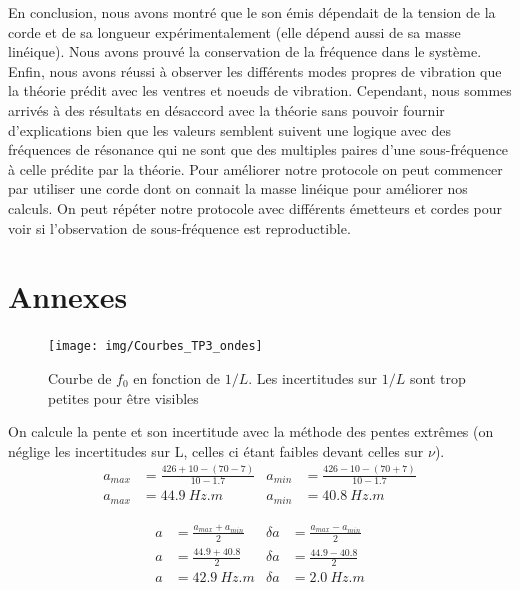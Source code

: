 \documentclass[11pt]{article}
\begin{document}
En conclusion, nous avons montré que le son émis dépendait de la tension de la corde et de sa longueur expérimentalement (elle dépend aussi de sa masse linéique). Nous avons prouvé la conservation de la fréquence dans le système.
Enfin, nous avons réussi à observer les différents modes propres de vibration que la théorie prédit avec les ventres et noeuds de vibration. Cependant, nous sommes arrivés à des résultats en désaccord avec la théorie
sans pouvoir fournir d'explications bien que les valeurs semblent suivent une logique avec des fréquences de résonance qui ne sont que des multiples paires d'une sous-fréquence à celle prédite par la théorie. 
Pour améliorer notre protocole on peut commencer par utiliser une corde dont on connait la masse linéique pour améliorer nos calculs. 
On peut répéter notre protocole avec différents émetteurs et cordes pour voir si l'observation de sous-fréquence est reproductible.

\newpage

\section*{Annexes}

\begin{figure}[h!]
    \begin{center}
        \texttt{[image: img/Courbes\_TP3\_ondes]}
        \caption{Courbe de $f_0$ en fonction de $1/L$. Les incertitudes sur $1/L$ sont trop petites pour être visibles}
        \label{img:Courbe_derniere_expérience}
    \end{center}
\end{figure}

On calcule la pente et son incertitude avec la méthode des pentes extrêmes (on néglige les incertitudes sur L, celles ci étant faibles devant celles sur $\nu$). 
\begin{align*}
    a_{max} &=\frac{426+10-(70-7)}{10-1.7} & a_{min} &=\frac{426-10-(70+7)}{10-1.7} \\
    a_{max} &=44.9 \ Hz.m & a_{min} &= 40.8 \ Hz.m
\end{align*}

\begin{align*}
    a&=\frac{a_{max} + a_{min}}{2} &\delta a &= \frac{a_{max} - a_{min}}{2} \\
    a&=\frac{44.9 + 40.8}{2} &\delta a &= \frac{44.9 - 40.8}{2} \\
    a&= 42.9 \ Hz.m &\delta a &= 2.0 \ Hz.m
\end{align*}
\end{document}
